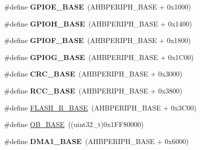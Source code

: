 \begin{DoxyCompactItemize}
\item 
\hypertarget{group___peripheral__memory__map_gab487b1983d936c4fee3e9e88b95aad9d}{\#define {\bfseries G\-P\-I\-O\-E\-\_\-\-B\-A\-S\-E}~(A\-H\-B\-P\-E\-R\-I\-P\-H\-\_\-\-B\-A\-S\-E + 0x1000)}\label{group___peripheral__memory__map_gab487b1983d936c4fee3e9e88b95aad9d}

\item 
\hypertarget{group___peripheral__memory__map_gaee4716389f3a1c727495375b76645608}{\#define {\bfseries G\-P\-I\-O\-H\-\_\-\-B\-A\-S\-E}~(A\-H\-B\-P\-E\-R\-I\-P\-H\-\_\-\-B\-A\-S\-E + 0x1400)}\label{group___peripheral__memory__map_gaee4716389f3a1c727495375b76645608}

\item 
\hypertarget{group___peripheral__memory__map_ga7f9a3f4223a1a784af464a114978d26e}{\#define {\bfseries G\-P\-I\-O\-F\-\_\-\-B\-A\-S\-E}~(A\-H\-B\-P\-E\-R\-I\-P\-H\-\_\-\-B\-A\-S\-E + 0x1800)}\label{group___peripheral__memory__map_ga7f9a3f4223a1a784af464a114978d26e}

\item 
\hypertarget{group___peripheral__memory__map_ga5d8ca4020f2e8c00bde974e8e7c13cfe}{\#define {\bfseries G\-P\-I\-O\-G\-\_\-\-B\-A\-S\-E}~(A\-H\-B\-P\-E\-R\-I\-P\-H\-\_\-\-B\-A\-S\-E + 0x1\-C00)}\label{group___peripheral__memory__map_ga5d8ca4020f2e8c00bde974e8e7c13cfe}

\item 
\hypertarget{group___peripheral__memory__map_ga656a447589e785594cbf2f45c835ad7e}{\#define {\bfseries C\-R\-C\-\_\-\-B\-A\-S\-E}~(A\-H\-B\-P\-E\-R\-I\-P\-H\-\_\-\-B\-A\-S\-E + 0x3000)}\label{group___peripheral__memory__map_ga656a447589e785594cbf2f45c835ad7e}

\item 
\hypertarget{group___peripheral__memory__map_ga0e681b03f364532055d88f63fec0d99d}{\#define {\bfseries R\-C\-C\-\_\-\-B\-A\-S\-E}~(A\-H\-B\-P\-E\-R\-I\-P\-H\-\_\-\-B\-A\-S\-E + 0x3800)}\label{group___peripheral__memory__map_ga0e681b03f364532055d88f63fec0d99d}

\item 
\#define \hyperlink{group___peripheral__memory__map_ga8e21f4845015730c5731763169ec0e9b}{F\-L\-A\-S\-H\-\_\-\-R\-\_\-\-B\-A\-S\-E}~(A\-H\-B\-P\-E\-R\-I\-P\-H\-\_\-\-B\-A\-S\-E + 0x3\-C00)
\item 
\#define \hyperlink{group___peripheral__memory__map_gab5b5fb155f9ee15dfb6d757da1adc926}{O\-B\-\_\-\-B\-A\-S\-E}~((uint32\-\_\-t)0x1\-F\-F80000)
\item 
\hypertarget{group___peripheral__memory__map_gab2d8a917a0e4ea99a22ac6ebf279bc72}{\#define {\bfseries D\-M\-A1\-\_\-\-B\-A\-S\-E}~(A\-H\-B\-P\-E\-R\-I\-P\-H\-\_\-\-B\-A\-S\-E + 0x6000)}\label{group___peripheral__memory__map_gab2d8a917a0e4ea99a22ac6ebf279bc72}


\end{DoxyCompactItemize}
